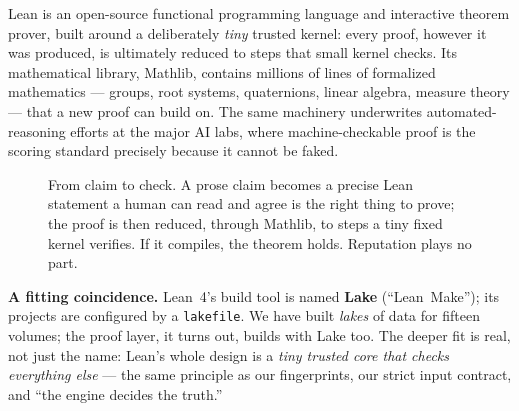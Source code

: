 \documentclass[11pt, letterpaper, openany]{book}
\begin{document}
Lean is an open-source functional programming language and interactive theorem prover, built around a
deliberately \emph{tiny} trusted kernel: every proof, however it was produced, is ultimately reduced
to steps that small kernel checks. Its mathematical library, Mathlib, contains millions of lines of
formalized mathematics --- groups, root systems, quaternions, linear algebra, measure theory --- that
a new proof can build on. The same machinery underwrites automated-reasoning efforts at the major AI
labs, where machine-checkable proof is the scoring standard precisely because it cannot be faked.

\begin{figure}[H]
\centering
{}
\caption{From claim to check. A prose claim becomes a precise Lean statement a human can read and
agree is the right thing to prove; the proof is then reduced, through Mathlib, to steps a tiny fixed
kernel verifies. If it compiles, the theorem holds. Reputation plays no part.}
\end{figure}

\begin{warningbox}
\textbf{A fitting coincidence.} Lean~4's build tool is named \textbf{Lake} (``Lean~Make''); its
projects are configured by a \texttt{lakefile}. We have built \emph{lakes} of data for fifteen
volumes; the proof layer, it turns out, builds with Lake too. The deeper fit is real, not just the
name: Lean's whole design is a \emph{tiny trusted core that checks everything else} --- the same
principle as our fingerprints, our strict input contract, and ``the engine decides the truth.''
\end{warningbox}
\end{document}
